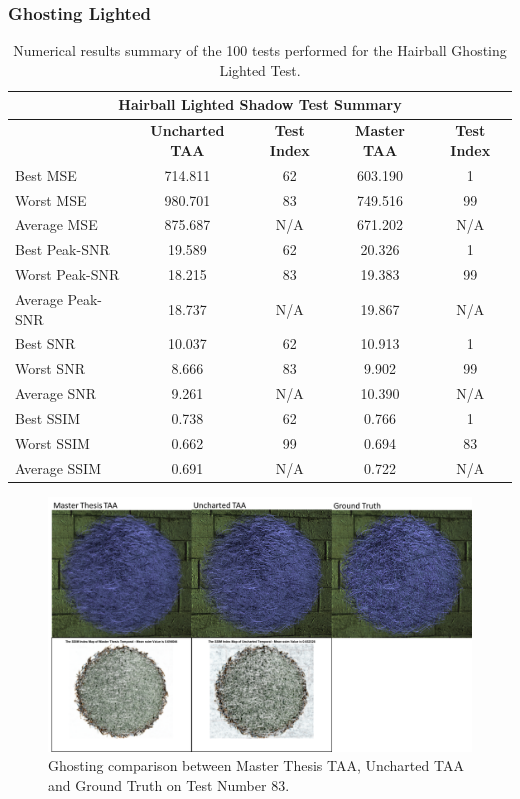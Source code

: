 \documentclass{cslthse-msc}
\begin{document}
\subsubsection{Ghosting Lighted}
\begin{table}[H]
	\small
	\centering
	\caption{Numerical results summary of the 100 tests performed for the Hairball Ghosting Lighted Test.}
	\begin{tabular}{|l|c|c|c|c|}
		\hline
		\multicolumn{5}{|c|}{\textbf{Hairball Lighted Shadow Test Summary}} \\
		\hline
		\multicolumn{1}{|c|}{\textbf{\diagbox{Tests}{AA}}} & \textbf{Uncharted TAA} & \textbf{Test Index} & \textbf{Master TAA} & \textbf{Test Index} \\
		\hline
		Best MSE & 714.811 & 62    & 603.190 & 1 \\
		\hline
		Worst MSE & 980.701 & 83    & 749.516 & 99 \\
		\hline
		Average MSE & 875.687 & N/A   & 671.202 & N/A \\
		\hline
		Best Peak-SNR & 19.589 & 62    & 20.326 & 1 \\
		\hline
		Worst Peak-SNR & 18.215 & 83    & 19.383 & 99 \\
		\hline
		Average Peak-SNR  & 18.737 & N/A   & 19.867 & N/A \\
		\hline
		Best SNR & 10.037 & 62    & 10.913 & 1 \\
		\hline
		Worst SNR & 8.666 & 83    & 9.902 & 99 \\
		\hline
		Average SNR  & 9.261 & N/A   & 10.390 & N/A \\
		\hline
		Best SSIM & 0.738 & 62    & 0.766 & 1 \\
		\hline
		Worst SSIM & 0.662 & 99    & 0.694 & 83 \\
		\hline
		Average SSIM & 0.691 & N/A   & 0.722 & N/A \\
		\hline
	\end{tabular}%
	\label{tab:hairball_ghosting_lighted}%
\end{table}%

\begin{figure}[H]
	\centering
	\includegraphics[scale=0.8]{images/results/hairball_ghosting_lighted.png}
	\caption{Ghosting comparison between Master Thesis TAA, Uncharted TAA and Ground Truth on Test Number 83.}\label{fig:hairball_ghosting_lighted}
\end{figure}
\end{document}
